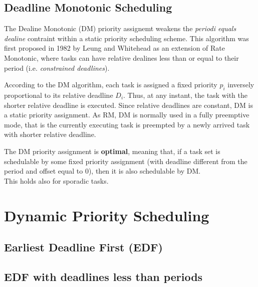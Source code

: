 \subsection{Deadline Monotonic Scheduling}
The Dealine Monotonic (DM) priority assignemt weakens the \textit{periodi equals dealine} contraint within a static priority scheduling scheme. This algorithm was first proposed in 1982 by Leung and Whitehead as an extension of Rate Monotonic, where tasks can have relative dealines less than or equal to their period (i.e. \textit{constrained deadlines}).

According to the DM algorithm, each task is assigned a fixed priority $p_i$ inversely proportional to its relative deadline $D_i$. Thus, at any instant, the task with the shorter relative deadline is executed. Since relative deadlines are constant, DM is a static priority assignment. As RM, DM is normally used in a fully preemptive mode, that is the currently executing task is preempted by a newly arrived task with shorter relative deadline.

The DM priority assignment is \textbf{optimal}, meaning that, if a task set is schedulable by some fixed priority assignment (with deadline different from the period and offset equal to 0), then it is also schedulable by DM.\\
This holds also for sporadic tasks.

\section{Dynamic Priority Scheduling}
\subsection{Earliest Deadline First (EDF)}
\subsection{EDF with deadlines less than periods}

